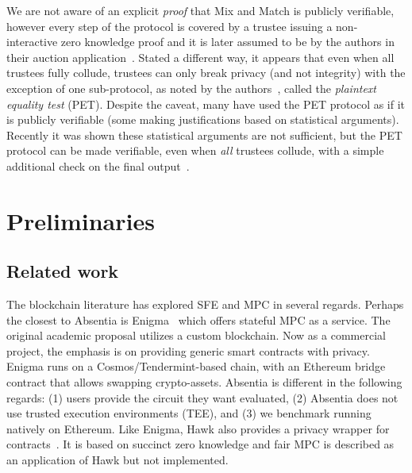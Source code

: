 We are not aware of an explicit \emph{proof} that Mix and Match is publicly verifiable, however every step of the protocol is covered by a trustee issuing a non-interactive zero knowledge proof and it is later assumed to be by the authors in their auction application~\cite{JJ00}. Stated a different way, it appears that even when all trustees fully collude, trustees can only break privacy (and not integrity) with the exception of one sub-protocol, as noted by the authors~\cite{JJ00}, called the \emph{plaintext equality test} (PET). Despite the caveat, many have used the PET protocol as if it is publicly verifiable (some making justifications based on statistical arguments). Recently it was shown these statistical arguments are not sufficient, but the PET protocol can be made verifiable, even when \emph{all} trustees collude, with a simple additional check on the final output~\cite{mcmurtry2020test}.


\section{Preliminaries}


\subsection{Related work}
\label{sec:lit}

The blockchain literature has explored SFE and MPC in several regards. Perhaps the closest to Absentia is Enigma~\cite{zyskind2015decentralizing} which offers stateful MPC as a service. The original academic proposal utilizes a custom blockchain. Now as a commercial project, the emphasis is on providing generic smart contracts with privacy. Enigma runs on a Cosmos/Tendermint-based chain, with an Ethereum bridge contract that allows swapping crypto-assets. Absentia is different in the following regards: (1) users provide the circuit they want evaluated, (2) Absentia does not use trusted execution environments (TEE), and (3) we benchmark running natively on Ethereum. Like Enigma, Hawk also provides a privacy wrapper for contracts~\cite{kosba2016hawk}. It is based on succinct zero knowledge and fair MPC is described as an application of Hawk but not implemented.  


